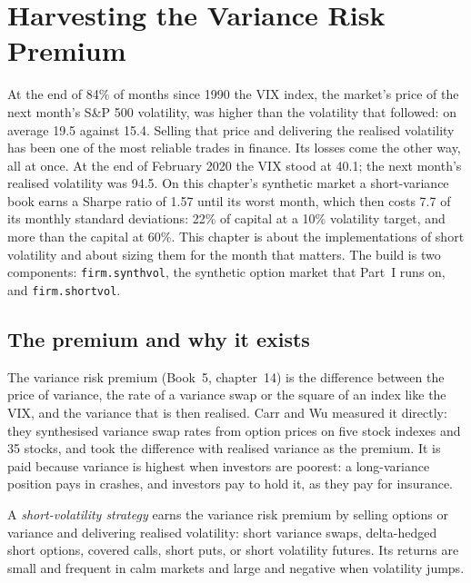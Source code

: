 \chapter{Harvesting the Variance Risk Premium}\label{ch:s2:harvesting-the-variance-risk-premium}

At the end of 84\% of months since 1990 the VIX index, the market's price of the next month's S\&P 500 volatility, was higher than the volatility that
followed: on average 19.5 against 15.4. Selling that price and delivering the realised volatility has been one of the most reliable trades in finance.
Its losses come the other way, all at once. At the end of February 2020 the VIX stood at 40.1; the next month's realised volatility was 94.5. On this
chapter's synthetic market a short-variance book earns a Sharpe ratio of 1.57 until its worst month, which then costs 7.7 of its monthly standard
deviations: 22\% of capital at a 10\% volatility target, and more than the capital at 60\%. This chapter is about the implementations of short
volatility and about sizing them for the month that matters. The build is two components: \texttt{firm.synthvol}, the synthetic option market that
Part~I runs on, and \texttt{firm.shortvol}.

\section{The premium and why it exists}

The variance risk premium (Book~5, chapter~14) is the difference between the price of variance, the rate of a variance swap or the square of an index
like the VIX, and the variance that is then realised. Carr and Wu measured it directly: they synthesised variance swap rates from option prices on
five stock indexes and 35 stocks, and took the difference with realised variance as the premium. It is paid because variance is highest when
investors are poorest: a long-variance position pays in crashes, and investors pay to hold it, as they pay for insurance.

\begin{definition}\label{def:s2:harvesting-the-variance-risk-premium:short}
A \emph{short-volatility strategy} earns the variance risk premium by selling options or variance and delivering
realised volatility: short variance swaps, delta-hedged short options, covered calls, short puts, or short volatility futures. Its returns are small and
frequent in calm markets and large and negative when volatility jumps.
\end{definition}

